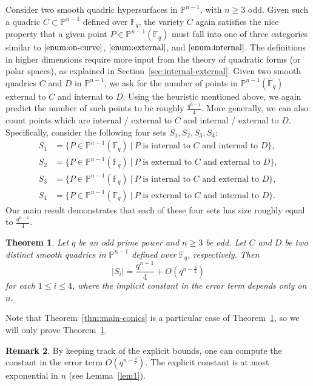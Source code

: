 \documentclass[12pt,reqno]{amsart}
\newtheorem{thm}{Theorem}[section]
\theoremstyle{definition}
\newtheorem{rem}[thm]{Remark}
\newcommand{\F}{\mathbb{F}}
\begin{document}
Consider two smooth quadric hypersurfaces in $\mathbb{P}^{n-1}$, with $n\geq 3$ odd. Given such a quadric $C\subset \mathbb{P}^{n-1}$ defined over $\F_q$, the variety $C$ again satisfies the nice property that a given point $P\in\mathbb{P}^{n-1}(\F_q)$ must fall into one of three categories similar to $\eqref{enum:on-curve}$, $\eqref{enum:external}$, and $\eqref{enum:internal}$. The definitions in higher dimensions require more input from the theory of quadratic forms (or polar spaces), as explained in Section~\ref{sec:internal-external}. Given two smooth quadrics $C$ and $D$ in $\mathbb{P}^{n-1}$, we ask for the number of points in $\mathbb{P}^{n-1}(\F_q)$ external to $C$ and internal to $D$. Using the heuristic mentioned above, we again predict the number of such points to be roughly $\frac{q^{n-1}}{4}$. More generally, we can also count points which are internal / external to $C$ and internal / external to $D$. Specifically, consider the following four sets $S_{1}, S_2, S_3, S_4$:
\begin{align*}
    S_1 &= \{P\in\mathbb{P}^{n-1}(\mathbb{F}_q) \ | \ P \text{ is internal to } C \text{ and internal to } D \}, \\ 
    S_2 &= \{P\in\mathbb{P}^{n-1}(\mathbb{F}_q) \ | \ P \text{ is external to } C \text{ and external to } D \}, \\ 
    S_3 &= \{P\in\mathbb{P}^{n-1}(\mathbb{F}_q) \ | \ P \text{ is internal to } C \text{ and external to } D \}, \\ 
    S_4 &= \{P\in\mathbb{P}^{n-1}(\mathbb{F}_q) \ | \ P \text{ is external to } C \text{ and internal to } D \}. 
\end{align*}
Our main result demonstrates that each of these four sets has size roughly equal to $\frac{q^{n-1}}{4}$.

\begin{thm}\label{thm:main-quadrics}
Let $q$ be an odd prime power and $n \geq 3$ be odd. Let $C$ and $D$ be two distinct smooth quadrics in $\mathbb{P}^{n-1}$ defined over $\F_q$, respectively. 
Then 
$$|S_i|=\frac{q^{n-1}}{4}+O(q^{n-\frac{3}{2}})$$
for each $1\leq i \leq 4$, where the implicit constant in the error term depends only on $n$.
\end{thm}

Note that Theorem~\ref{thm:main-conics} is a particular case of Theorem~\ref{thm:main-quadrics}, so we will only prove Theorem~\ref{thm:main-quadrics}. 

\begin{rem} By keeping track of the explicit bounds, one can compute the constant in the error term $O(q^{n-\frac{3}{2}})$. The explicit constant is at most exponential in $n$ (see Lemma~\ref{lem1}).
\end{rem}
\end{document}
